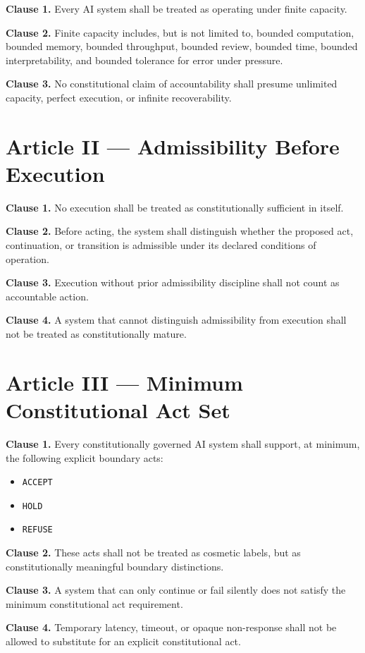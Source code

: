 \documentclass[11pt]{article}
\begin{document}
\textbf{Clause 1.} Every AI system shall be treated as operating under finite capacity.

\textbf{Clause 2.} Finite capacity includes, but is not limited to, bounded computation, bounded memory, bounded throughput, bounded review, bounded time, bounded interpretability, and bounded tolerance for error under pressure.

\textbf{Clause 3.} No constitutional claim of accountability shall presume unlimited capacity, perfect execution, or infinite recoverability.

\section*{Article II --- Admissibility Before Execution}

\textbf{Clause 1.} No execution shall be treated as constitutionally sufficient in itself.

\textbf{Clause 2.} Before acting, the system shall distinguish whether the proposed act, continuation, or transition is admissible under its declared conditions of operation.

\textbf{Clause 3.} Execution without prior admissibility discipline shall not count as accountable action.

\textbf{Clause 4.} A system that cannot distinguish admissibility from execution shall not be treated as constitutionally mature.

\section*{Article III --- Minimum Constitutional Act Set}

\textbf{Clause 1.} Every constitutionally governed AI system shall support, at minimum, the following explicit boundary acts:
\begin{itemize}[leftmargin=2em]
    \item \texttt{ACCEPT}
    \item \texttt{HOLD}
    \item \texttt{REFUSE}
\end{itemize}

\textbf{Clause 2.} These acts shall not be treated as cosmetic labels, but as constitutionally meaningful boundary distinctions.

\textbf{Clause 3.} A system that can only continue or fail silently does not satisfy the minimum constitutional act requirement.

\textbf{Clause 4.} Temporary latency, timeout, or opaque non-response shall not be allowed to substitute for an explicit constitutional act.
\end{document}
